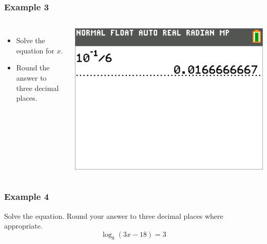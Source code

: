 \documentclass[aspectratio=169,17pt]{beamer}
\begin{document}
\begin{frame}
	\frametitle{Example 3}
	\begin{columns}
		\begin{itemize} \small
			\item Solve the equation for $x$.
			\item Round the answer to three decimal places.
		\end{itemize}
			\includegraphics[width=\textwidth]{Capture 2.png}
	\end{columns}
\end{frame}

\begin{frame}[t]
	\frametitle{Example 4}
	Solve the equation. Round your answer to three decimal places where appropriate.
	$$\log_8{\left(3x-18\right)} = 3$$
\end{frame}
\end{document}
